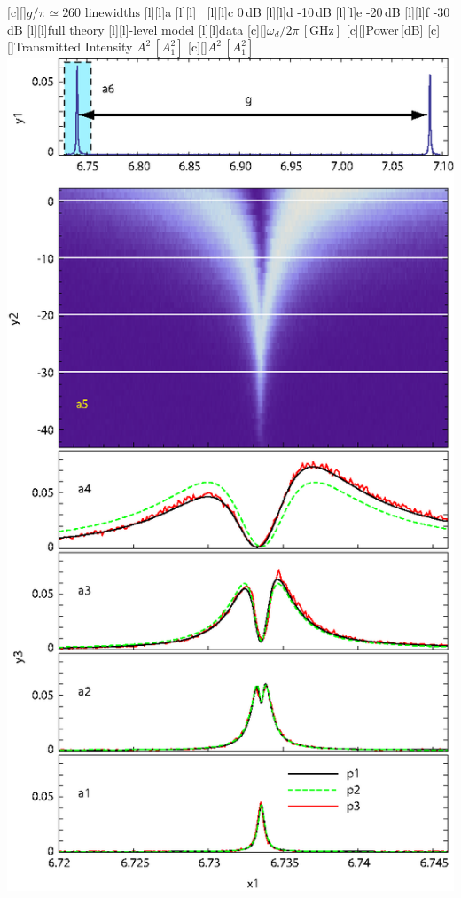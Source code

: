 

 \figstyle
 [c][]{$g/\pi\simeq260\text{ linewidths}$}
 [l][l]{\panelstyle a}
 [l][l]{\textcolor{white}{\panelstyle b}}
 [l][l]{{\panelstyle c } 0\,dB}
 [l][l]{{\panelstyle d } -10\,dB}
 [l][l]{{\panelstyle e } -20\,dB}
 [l][l]{{\panelstyle f } -30\,dB}
 [l][l]{\figsmaller full theory}
 [l][l]{-level model}
 [l][l]{\figsmaller data}
 [c][]{$\omega_d/2\pi\,[\text{GHz}]$}
 [c][]{Power\,[dB]}
 [c][]{Transmitted Intensity $A^2\,[A_1^2]$}
 [c][]{$A^2\,[A_1^2]$}
 \includegraphics[height=\textheight-3in]{supersplit.eps}

